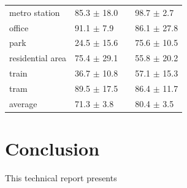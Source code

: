 \documentclass{article}
\begin{document}
\begin{sloppy}
\begin{table}[!htbp]
\begin{tabular}{llll}
metro station & 85.3 $\pm$ 18.0 & & 98.7 $\pm$  \phantom{0}2.7 \\

office & 91.1 $\pm$ \phantom{0}7.9 & & 86.1 $\pm$ 27.8 \\

park & 24.5 $\pm$ 15.6 & & 75.6 $\pm$ 10.5 \\

residential area & 75.4 $\pm$ 29.1 & & 55.8 $\pm$ 20.2 \\

train & 36.7 $\pm$ 10.8 & & 57.1 $\pm$ 15.3 \\

tram & 89.5 $\pm$ 17.5& & 86.4 $\pm$ 11.7 \\

\bottomrule

average & 71.3 $\pm$  \phantom{0}3.8 & & 80.4 $\pm$  \phantom{0}3.5
\end{tabular}
\end{table}

\section{Conclusion}
This technical report presents 




\end{sloppy}
\end{document}
